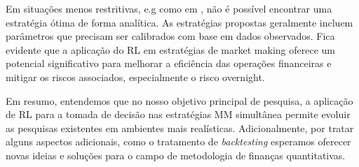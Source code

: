 Em situações menos restritivas, e.g como em \citet{Avellaneda2008}, não é possível encontrar uma estratégia ótima de forma analítica. As estratégias propostas geralmente incluem parâmetros que precisam ser calibrados com base em dados observados.
Fica evidente que a aplicação do RL em estratégias de market making oferece um potencial significativo para melhorar a eficiência das operações financeiras e mitigar os riscos associados, especialmente o risco overnight. 

Em resumo, entendemos que no nosso objetivo principal de pesquisa, a aplicação de RL para a tomada de decisão nas estratégias MM simultânea permite evoluir as pesquisas existentes em ambientes mais realísticas. 
Adicionalmente, por tratar alguns aspectos adicionais, como o tratamento de \textit{backtesting} esperamos oferecer novas ideias e soluções para o campo de metodologia de finanças quantitativas.

